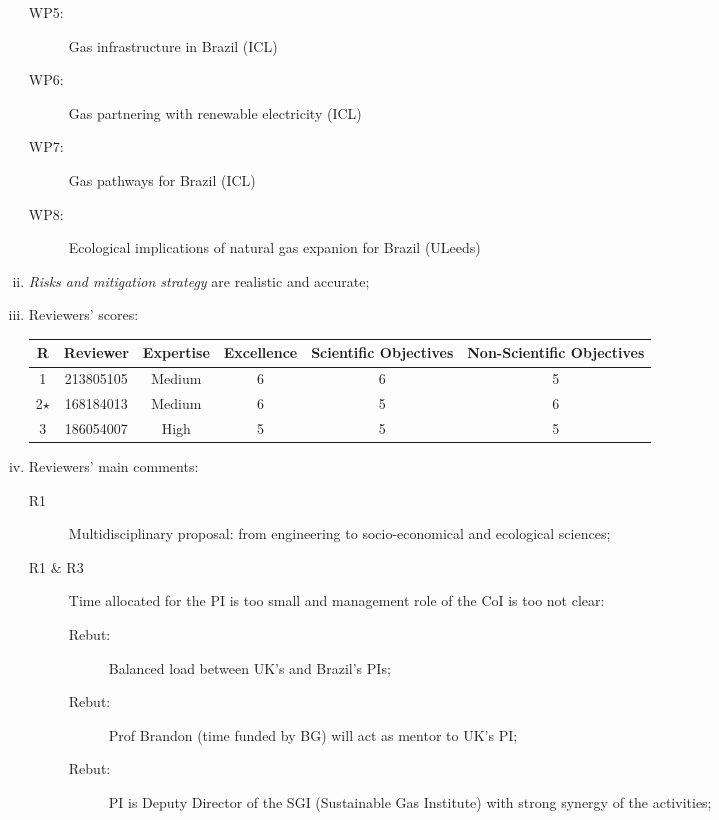 \documentclass[14pt,twoside]{report}
\begin{document}
\begin{enumerate}[(i)]
\begin{description}
           \item[WP5:] Gas infrastructure in Brazil (ICL)
           \item[WP6:] Gas partnering with renewable electricity (ICL)
           \item[WP7:] Gas pathways for Brazil (ICL)
           \item[WP8:] Ecological implications of natural gas expanion for Brazil (ULeeds)
      \end{description}
%
   \item {\it Risks and mitigation strategy} are realistic and accurate;
%
   \item Reviewers' scores:
       \begin{center}
          \begin{tabular}{c c | c c c c }
              \hline
               {\bf R} & {\bf Reviewer} & {\bf Expertise} & {\bf Excellence}  & {\bf Scientific Objectives} & {\bf Non-Scientific Objectives} \\ 
              \hline
                 1     &  213805105    &  Medium         &      6            &          6                  &         5                       \\
             2$\star$  &  168184013    &  Medium         &      6            &          5                  &         6                       \\
                 3     &  186054007    &  High           &      5            &          5                  &         5                       \\
              \hline
          \end{tabular}
       \end{center}
%
   \item Reviewers' main comments:
       \begin{description}
%
          \item[R1] Multidisciplinary proposal: from engineering to socio-economical and ecological sciences;
          \item[R1 $\&$ R3] Time allocated for the PI is too small and management role of the CoI is too not clear:
            \begin{description}
               \item[Rebut:] Balanced load between UK's and Brazil's PIs;
               \item[Rebut:] Prof Brandon (time funded by BG) will act as mentor to UK's PI;
               \item[Rebut:] PI is Deputy Director of the SGI (Sustainable Gas Institute) with strong synergy of the activities;

\end{description}
\end{description}
\end{enumerate}
\end{document}
